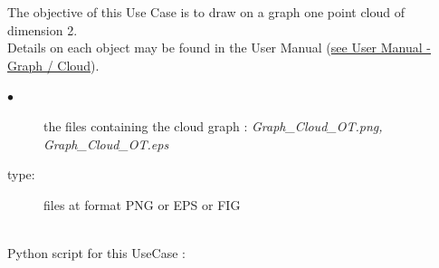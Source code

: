 \renewcommand{\filename}{docUC_InputWithData_CloudDrawing.tex}
\renewcommand{\filetitle}{UC :  Drawing one cloud }

\HeaderIIILevel






The objective of this Use Case is to draw on a graph one point cloud of dimension 2.\\

Details on each object may be found in the User Manual  (\href{OpenTURNS_UserManual_TUI.pdf}{see User Manual - Graph / Cloud}).\\


{
  \begin{description}
  \item[$\bullet$] the files containing the cloud graph : {\itshape Graph\_Cloud\_OT.png, Graph\_Cloud\_OT.eps}
  \item[type:] files at format PNG or EPS or FIG
  \end{description}
}

\textspace\\
Python script for this UseCase :

